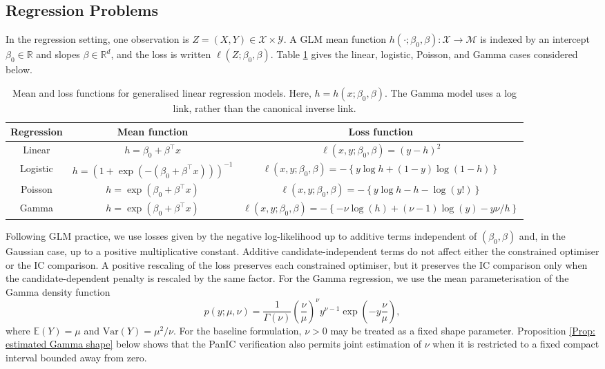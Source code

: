 \documentclass[12pt]{article}
\theoremstyle{remark}
\theoremstyle{plain}
\begin{document}
\subsection{Regression Problems} \label{Sect: Regression}
In the regression setting, one observation is $Z=(X,Y)\in\mathcal X\times\mathcal Y$. A GLM mean function $h(\cdot;\beta_0,\beta):\mathcal X\to\mathcal M$ is indexed by an intercept $\beta_0\in\mathbb R$ and slopes $\beta\in\mathbb R^d$, and the loss is written $\ell(Z;\beta_0,\beta)$. Table \ref{Table: Regression} gives the linear, logistic, Poisson, and Gamma cases considered below.
\begin{table}[H]
\captionsetup{font=footnotesize}
\caption{Mean and loss functions for generalised linear regression models. Here, $h=h(x;\beta_0,\beta)$. The Gamma model uses a log link, rather than the canonical inverse link.}
\label{Table: Regression}
\centering
\footnotesize
\begin{tabular}{c c c}
 Regression & Mean function & Loss function\\
  [0.5ex]
  \hline\hline
 Linear & $h = \beta_0 + \beta^\top x$ & $\ell(x, y; \beta_0, \beta) = \left(y - h\right)^2$ \rule{0pt}{5ex}\\
 Logistic & $h = (1 + \exp(-(\beta_0 + \beta^\top x)))^{-1}$ & $ \ell(x, y; \beta_0, \beta) = -\left\{y\log h
     + (1 - y)\log\left(1 - h\right)\right\}
$ \rule{0pt}{5ex}\\
 Poisson & $h = \exp(\beta_0 + \beta^\top x)$ & $
 \ell(x, y; \beta_0, \beta) = -\left\{y\log h - h
 -\log(y!) \right\} $ \rule{0pt}{5ex}\\
 Gamma & $h = \exp(\beta_0 + \beta^\top x)$ & $
 \ell(x, y; \beta_0, \beta) = -\left\{ -\nu\log(h)
  + (\nu - 1) \log (y)
 - y\nu/h\right\} $ \rule{0pt}{5ex}\\[4ex]
 \hline\hline
\end{tabular}
\end{table}
\noindent Following GLM practice, we use losses given by the negative log-likelihood up to additive terms independent of $(\beta_0,\beta)$ and, in the Gaussian case, up to a positive multiplicative constant. Additive candidate-independent terms do not affect either the constrained optimiser or the IC comparison. A positive rescaling of the loss preserves each constrained optimiser, but it preserves the IC comparison only when the candidate-dependent penalty is rescaled by the same factor. For the Gamma regression, we use the mean parameterisation of the Gamma density function
\[
p(y;\mu, \nu) = \frac{1}{\Gamma(\nu)}\left(\frac{\nu}{\mu}\right)^\nu y^{\nu-1}\exp\left(-y\frac{\nu}{\mu}\right),
\]
where $\mathbb{E}(Y) = \mu$ and $\mathrm{Var}(Y) = \mu^2/\nu$.
For the baseline formulation, $\nu>0$ may be treated as a fixed shape parameter. Proposition \ref{Prop: estimated Gamma shape} below shows that the PanIC verification also permits joint estimation of $\nu$ when it is restricted to a fixed compact interval bounded away from zero.
\end{document}
